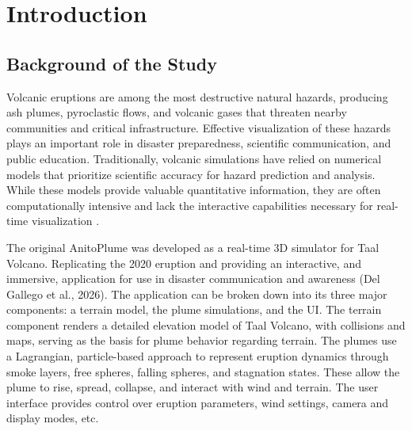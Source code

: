 %
%
%                 

\chapter{Introduction}
\label{sec:intro}    %



\section{Background of the Study}
\label{sec:overview}

%
%


Volcanic eruptions are among the most destructive natural hazards, producing ash plumes, pyroclastic flows, and volcanic gases that threaten nearby communities and critical infrastructure. 
Effective visualization of these hazards plays an important role in disaster preparedness, scientific communication, and public education. 
Traditionally, volcanic simulations have relied on numerical models that prioritize scientific accuracy for hazard prediction and analysis. 
While these models provide valuable quantitative information, they are often computationally intensive and lack the interactive capabilities necessary for real-time visualization \cite{rossant2021high}.


The original AnitoPlume was developed as a real-time 3D simulator for Taal Volcano. 
Replicating the 2020 eruption and providing an interactive, and immersive, application for use in disaster communication and awareness (Del Gallego et al., 2026). 
The application can be broken down into its three major components: a terrain model, the plume simulations, and the UI. The terrain component renders a detailed elevation model of Taal Volcano, with collisions and maps, serving as the basis for plume behavior regarding terrain. 
The plumes use a Lagrangian, particle-based approach to represent eruption dynamics through smoke layers, free spheres, falling spheres, and stagnation states. 
These allow the plume to rise, spread, collapse, and interact with wind and terrain. The user interface provides control over eruption parameters, wind settings, camera and display modes, etc. 

